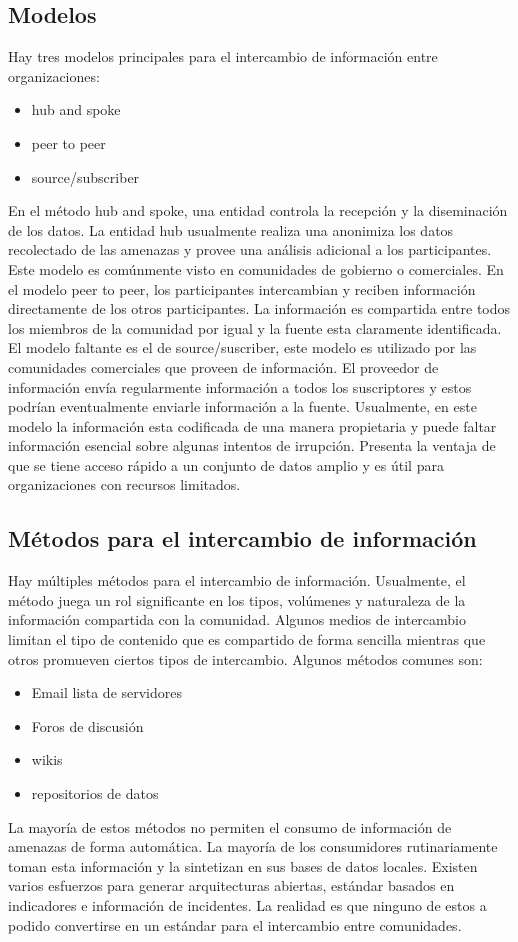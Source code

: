 \subsection{Modelos} %
Hay tres modelos principales para el intercambio de información entre 
organizaciones:
\begin{itemize}
  \item hub and spoke
  \item peer to peer
  \item source/subscriber
\end{itemize}
En el método hub and spoke, una entidad controla la recepción y la diseminación 
de los datos. La entidad hub usualmente realiza una anonimiza los datos 
recolectado de las amenazas y provee una análisis adicional a los participantes. 
Este modelo es comúnmente visto en comunidades de gobierno o comerciales.
En el modelo peer to peer, los participantes intercambian y reciben información 
directamente de los otros participantes. La información es compartida entre 
todos los miembros de la comunidad por igual y la fuente esta claramente 
identificada.
El modelo faltante es el de source/suscriber, este modelo es utilizado por las 
comunidades comerciales que proveen de información. El proveedor de información 
envía regularmente información a todos los suscriptores y estos podrían 
eventualmente enviarle información a la fuente. Usualmente, en este modelo la 
información esta codificada de una manera propietaria y puede faltar 
información esencial sobre algunas intentos de irrupción. Presenta la ventaja de 
que se tiene acceso rápido a un conjunto de datos amplio y es útil para 
organizaciones con recursos limitados.
\subsection{Métodos para el intercambio de información}
Hay múltiples métodos para el intercambio de información. Usualmente, el método 
juega un rol significante en los tipos, volúmenes y naturaleza de la información 
compartida con la comunidad. Algunos medios de intercambio limitan el tipo de 
contenido que es compartido de forma sencilla mientras que otros promueven 
ciertos tipos de intercambio.
Algunos métodos comunes son:
\begin{itemize}
  \item Email lista de servidores
  \item Foros de discusión
  \item wikis
  \item repositorios de datos
\end{itemize}
La mayoría de estos métodos no permiten el consumo de información de amenazas de 
forma automática. La mayoría de los consumidores rutinariamente toman esta 
información y la sintetizan en sus bases de datos locales.
Existen varios esfuerzos para generar arquitecturas abiertas, estándar 
basados en indicadores e información de incidentes. La realidad es que ninguno 
de estos a podido convertirse en un estándar para el intercambio entre comunidades.


